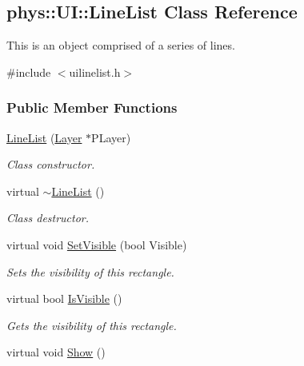 \hypertarget{classphys_1_1UI_1_1LineList}{
\subsection{phys::UI::LineList Class Reference}
\label{d7/de8/classphys_1_1UI_1_1LineList}
}


This is an object comprised of a series of lines.  




{\ttfamily \#include $<$uilinelist.h$>$}

\subsubsection*{Public Member Functions}
\begin{DoxyCompactItemize}
\item 
\hyperlink{classphys_1_1UI_1_1LineList_a4eb08071252e1bddf1237d6a4018a86c}{LineList} (\hyperlink{classphys_1_1UI_1_1Layer}{Layer} $\ast$PLayer)
\begin{DoxyCompactList}\small\item\em Class constructor. \item\end{DoxyCompactList}\item 
\hypertarget{classphys_1_1UI_1_1LineList_ae962ca10492137ed85f7b66a79d4887e}{
virtual \hyperlink{classphys_1_1UI_1_1LineList_ae962ca10492137ed85f7b66a79d4887e}{$\sim$LineList} ()}
\label{d7/de8/classphys_1_1UI_1_1LineList_ae962ca10492137ed85f7b66a79d4887e}

\begin{DoxyCompactList}\small\item\em Class destructor. \item\end{DoxyCompactList}\item 
virtual void \hyperlink{classphys_1_1UI_1_1LineList_acecf11c133825233afd73d55ba9e4c1d}{SetVisible} (bool Visible)
\begin{DoxyCompactList}\small\item\em Sets the visibility of this rectangle. \item\end{DoxyCompactList}\item 
virtual bool \hyperlink{classphys_1_1UI_1_1LineList_af8c50f2e60b5a087cc9f3a280e10bd72}{IsVisible} ()
\begin{DoxyCompactList}\small\item\em Gets the visibility of this rectangle. \item\end{DoxyCompactList}\item 
\hypertarget{classphys_1_1UI_1_1LineList_ae725a770a9b938d01f1a161be050fcc5}{
virtual void \hyperlink{classphys_1_1UI_1_1LineList_ae725a770a9b938d01f1a161be050fcc5}{Show} ()}
\label{d7/de8/classphys_1_1UI_1_1LineList_ae725a770a9b938d01f1a161be050fcc5}


\end{DoxyCompactItemize}

